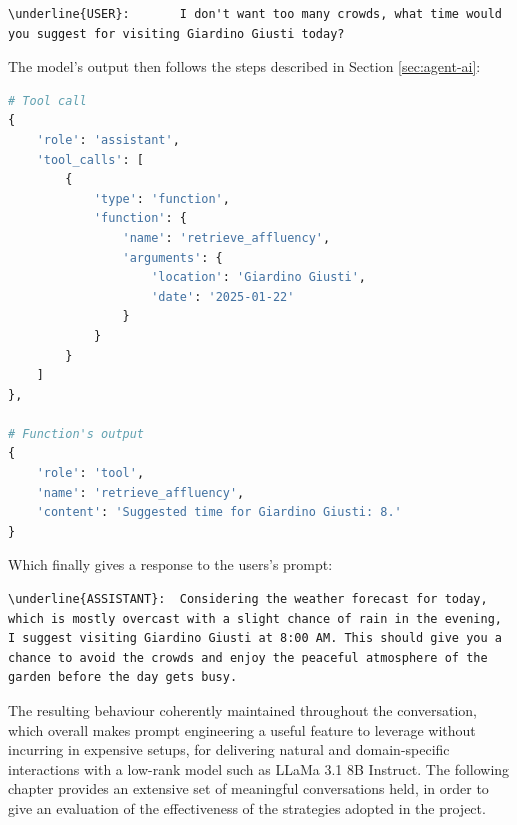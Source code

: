 \begin{Verbatim}[breaklines=true]
\underline{USER}:       I don't want too many crowds, what time would you suggest for visiting Giardino Giusti today?
\end{Verbatim}

The model's output then follows the steps described in Section \ref{sec:agent-ai}:

\begin{center}
\begin{lstlisting}[language=Python, frame=single, caption=Tool call]
# Tool call
{
    'role': 'assistant',
    'tool_calls': [
        {
            'type': 'function',
            'function': {
                'name': 'retrieve_affluency',
                'arguments': {
                    'location': 'Giardino Giusti',
                    'date': '2025-01-22'
                }
            }
        }
    ]
},

# Function's output
{
    'role': 'tool',
    'name': 'retrieve_affluency',
    'content': 'Suggested time for Giardino Giusti: 8.'
}
\end{lstlisting}
\end{center}

Which finally gives a response to the users's prompt:

\begin{Verbatim}[breaklines=true]
\underline{ASSISTANT}:  Considering the weather forecast for today, which is mostly overcast with a slight chance of rain in the evening, I suggest visiting Giardino Giusti at 8:00 AM. This should give you a chance to avoid the crowds and enjoy the peaceful atmosphere of the garden before the day gets busy.
\end{Verbatim}

The resulting behaviour coherently maintained throughout the conversation, which overall makes prompt engineering a useful feature to leverage without incurring in expensive setups, for delivering natural and domain-specific interactions with a low-rank model such as LLaMa 3.1 8B Instruct. The following chapter provides an extensive set of meaningful conversations held, in order to give an evaluation of the effectiveness of the strategies adopted in the project.